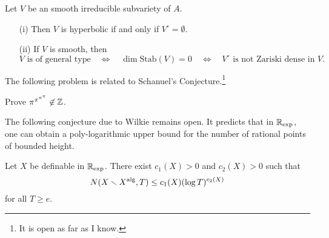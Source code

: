\begin{theorem} Let $V$ be an smooth  irreducible subvariety of $A$. 
  \begin{enumerate}
  \item [(i)]  Then $V$ is hyperbolic if and only if
    $V^{\circ}=\emptyset$. 
  \item[(ii)] If $V$ is smooth, then
    \begin{equation*}
      V \text{ is of general type}\quad\Leftrightarrow \quad\dim
      \mathrm{Stab}(V)=0 \quad\Leftrightarrow\quad
      \text{$V^{\circ}$ is
        not Zariski dense in $V$.}
    \end{equation*}
  \end{enumerate}
\end{theorem}

The following problem is related to Schanuel's Conjecture.\footnote{It is
  open as far as I know.}

\begin{exercise}
  Prove $\pi^{\pi^{\pi^\pi}}\not\in{\mathbb{Z}}$.    
\end{exercise}

The following conjecture due to Wilkie remains open. It predicts that
in ${{\mathbb{R}}_{\mathrm{exp}}}$, one can obtain a poly-logarithmic upper bound for the
number of rational points of bounded height. 

\begin{conjecture}[Wilkie]
  Let $X$ be definable in ${{\mathbb{R}}_{\mathrm{exp}}}$. There exist $c_1(X)>0$ and $c_2(X)>0$
  such that
  \begin{equation*}
    N(X\smallsetminus X^{\mathrm{alg}},T) \le c_1(X) (\log T)^{c_2(X)}
  \end{equation*}
  for all $T\ge e$.
\end{conjecture}

